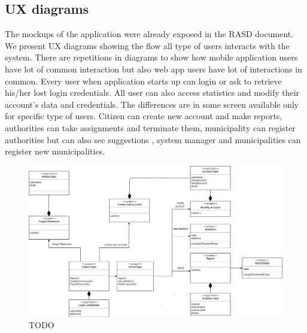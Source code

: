 \subsection{UX diagrams}
The mockups of the application were already exposed in the RASD document.
\newline
We present UX diagrams showing the flow all type of users interacts with the system. 
There are repetitions in diagrams to show how mobile application users have lot of common interaction but also web app users have lot of interactions in common.
Every user when application starts up can login or ask to retrieve his/her lost login credentials.
All user can also access statistics and modify their account's data and credentials.
The differences are in some screen available only for specific type of users.
Citizen can create new account and make reports, authorities can take assignments and terminate them, municipality can register  authorities but can also see suggestions , system manager and municipalities can register new municipalities. 
\begin{figure}[h]
\centering
\includegraphics[width=\textwidth]{Images/ux1-correct.png}
\caption{\label{fig:ls}TODO }
\end{figure}

